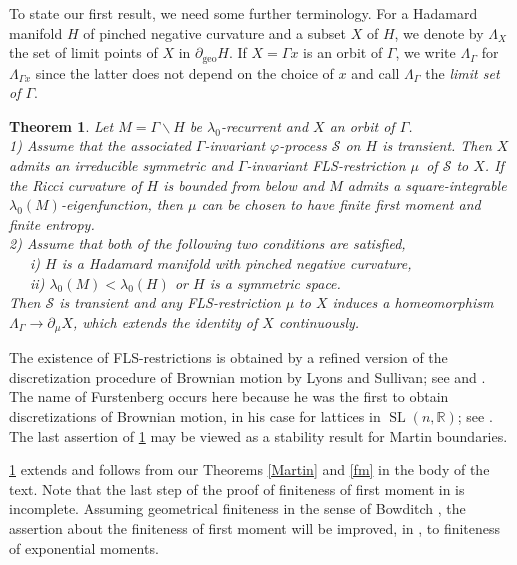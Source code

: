 \documentclass[12pt,a4paper]{amsart}
\newcounter{alph}
\newtheorem{theo}[alph]{Theorem}
\numberwithin{equation}{section}
\theoremstyle{definition}
\DeclareMathOperator{\geo}{geo}
\DeclareMathOperator{\Sl}{SL}
\def\R{\mathbb R}
\def\vf{\varphi}
\begin{document}
To state our first result, we need some further terminology.
For a Hada\-mard manifold $H$ of pinched negative curvature and a subset $X$ of $H$, we denote by $\Lambda_X$ the set of limit points of $X$ in $\partial_{\geo}H$.
If $X=\Gamma x$ is an orbit of $\Gamma$, we write $\Lambda_\Gamma$ for $\Lambda_{\Gamma x}$ since the latter does not depend on the choice of $x$ and call $\Lambda_\Gamma$ the \emph{limit set of $\Gamma$}.

\begin{theo}\label{main1}
Let $M=\Gamma\backslash H$ be $\lambda_0$-recurrent and $X$ an orbit of $\Gamma$.\\
1) Assume that the associated $\Gamma$-invariant $\vf$-process $\mathcal{S}$ on $H$ is transient.
Then $X$ admits an irreducible symmetric and $\Gamma$-invariant FLS-restriction $\mu$\ of $\mathcal S$ to $X$.
If the Ricci curvature of $H$ is bounded from below and $M$ admits a square-integrable $\lambda_0(M)$-eigenfunc\-tion, then $\mu$ can be chosen to have finite first moment and finite entropy. \\
2) Assume that both of the following two conditions are satisfied, \\
$\phantom{xx}$ i)
 $H$ is a Hadamard manifold with pinched negative curvature, \\
$\phantom{xx}$ ii)
$\lambda_0(M)<\lambda_0(H)$ or $H$ is a symmetric space. \\
Then $\mathcal{S}$ is transient and any FLS-restriction $\mu$ to $X$ induces a homeomorphism $\Lambda_\Gamma\to\partial_\mu X$, which extends the identity of $X$ continuously.
\end{theo}

The existence of FLS-restrictions is obtained by a refined version of the discretization procedure of Brownian motion by Lyons and Sullivan; see \cite{LS} and \cite[Theorem 3.1]{BL2}.
The name of Furstenberg occurs here because he was the first to obtain discretizations of Brownian motion, in his case for lattices in $\Sl(n,\R)$; see \cite[Sections 5 and 6]{Fu}.
The last assertion of \cref{main1} may be viewed as a stability result for Martin boundaries.

\cref{main1} extends \cite[Theorem 3.2]{BL2} and follows from our Theorems \ref{Martin} and \ref{fm} in the body of the text.
Note that the last step of the proof of finiteness of first moment in \cite{BL2} is incomplete.
Assuming geometrical finiteness in the sense of Bowditch \cite{Bo}, the assertion about the finiteness of first moment will be improved, in \cite{Nan2}, to finiteness of exponential moments. 
\end{document}
